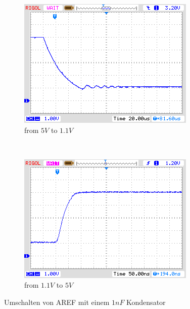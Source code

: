 \begin{figure}[H]
  \begin{subfigure}[b]{.5\textwidth}
    \centering
    \includegraphics[width=.95\textwidth]{../PNG/AREF2_1V.png}
    \caption{from \(5V\) to \(1.1V\) }
    \label{pic:aref1}
  \end{subfigure}
  ~
  \begin{subfigure}[b]{.5\textwidth}
    \centering
    \includegraphics[width=.95\textwidth]{../PNG/AREF2VCC.png}
    \caption{from \(1.1V\) to \(5V\)}
    \label{pic:aref5}
  \end{subfigure}
  \caption{Umschalten von AREF mit einem \(1nF\) Kondensator}
\end{figure}

